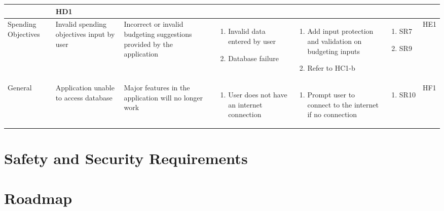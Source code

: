 \documentclass{article}
\begin{document}
\begin{landscape}
\begin{longtable}{|p{}|p{}|p{}|p{}|p{}|p{}|p{}|}
        & HD1 \\
        \hline
        Spending Objectives
        & Invalid spending objectives input by user
        & Incorrect or invalid budgeting suggestions provided by the application
        & \begin{enumerate}[label=\alph*., leftmargin=*]
            \item Invalid data entered by user
            \item Database failure
        \end{enumerate}
        & \begin{enumerate}[label=\alph*., leftmargin=*]
            \item Add input protection and validation on budgeting inputs
            \item Refer to HC1-b
        \end{enumerate}
        & \begin{enumerate}[label=\alph*., leftmargin=*]
            \item SR7
            \item SR9
        \end{enumerate}
        & HE1 \\
        \hline
        General
        & Application unable to access database
        & Major features in the application will no longer work
        & \begin{enumerate}[label=\alph*., leftmargin=*]
            \item User does not have an internet connection
        \end{enumerate}
        & \begin{enumerate}[label=\alph*., leftmargin=*]
            \item Prompt user to connect to the internet if no connection
        \end{enumerate}
        & \begin{enumerate}[label=\alph*., leftmargin=*]
            \item SR10
        \end{enumerate}
        & HF1 \\
        \hline
    \end{longtable}
\end{landscape}

\section{Safety and Security Requirements}


\section{Roadmap}

\end{document}
